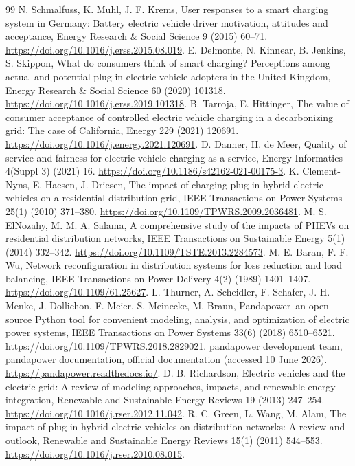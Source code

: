 \documentclass[12pt]{article}
\begin{document}
\begin{thebibliography}{99}
 N. Schmalfuss, K. Muhl, J. F. Krems, User responses to a smart charging system in Germany: Battery electric vehicle driver motivation, attitudes and acceptance, Energy Research \& Social Science 9 (2015) 60--71. \url{https://doi.org/10.1016/j.erss.2015.08.019}.
 E. Delmonte, N. Kinnear, B. Jenkins, S. Skippon, What do consumers think of smart charging? Perceptions among actual and potential plug-in electric vehicle adopters in the United Kingdom, Energy Research \& Social Science 60 (2020) 101318. \url{https://doi.org/10.1016/j.erss.2019.101318}.
 B. Tarroja, E. Hittinger, The value of consumer acceptance of controlled electric vehicle charging in a decarbonizing grid: The case of California, Energy 229 (2021) 120691. \url{https://doi.org/10.1016/j.energy.2021.120691}.
 D. Danner, H. de Meer, Quality of service and fairness for electric vehicle charging as a service, Energy Informatics 4(Suppl 3) (2021) 16. \url{https://doi.org/10.1186/s42162-021-00175-3}.
 K. Clement-Nyns, E. Haesen, J. Driesen, The impact of charging plug-in hybrid electric vehicles on a residential distribution grid, IEEE Transactions on Power Systems 25(1) (2010) 371--380. \url{https://doi.org/10.1109/TPWRS.2009.2036481}.
 M. S. ElNozahy, M. M. A. Salama, A comprehensive study of the impacts of PHEVs on residential distribution networks, IEEE Transactions on Sustainable Energy 5(1) (2014) 332--342. \url{https://doi.org/10.1109/TSTE.2013.2284573}.
 M. E. Baran, F. F. Wu, Network reconfiguration in distribution systems for loss reduction and load balancing, IEEE Transactions on Power Delivery 4(2) (1989) 1401--1407. \url{https://doi.org/10.1109/61.25627}.
 L. Thurner, A. Scheidler, F. Schafer, J.-H. Menke, J. Dollichon, F. Meier, S. Meinecke, M. Braun, Pandapower--an open-source Python tool for convenient modeling, analysis, and optimization of electric power systems, IEEE Transactions on Power Systems 33(6) (2018) 6510--6521. \url{https://doi.org/10.1109/TPWRS.2018.2829021}.
 pandapower development team, pandapower documentation, official documentation (accessed 10 June 2026). \url{https://pandapower.readthedocs.io/}.
 D. B. Richardson, Electric vehicles and the electric grid: A review of modeling approaches, impacts, and renewable energy integration, Renewable and Sustainable Energy Reviews 19 (2013) 247--254. \url{https://doi.org/10.1016/j.rser.2012.11.042}.
 R. C. Green, L. Wang, M. Alam, The impact of plug-in hybrid electric vehicles on distribution networks: A review and outlook, Renewable and Sustainable Energy Reviews 15(1) (2011) 544--553. \url{https://doi.org/10.1016/j.rser.2010.08.015}.

\end{thebibliography}
\end{document}
